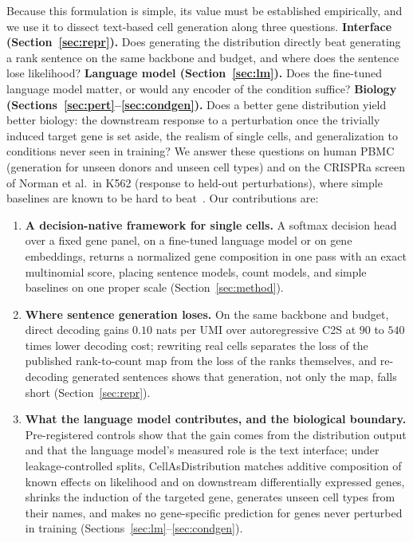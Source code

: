 \documentclass[10pt]{article}
\newcommand{\cad}{CellAsDistribution}
\begin{document}
Because this formulation is simple, its value must be established empirically, and we use it to dissect text-based cell generation along three questions.
\textbf{Interface (Section~\ref{sec:repr}).} Does generating the distribution directly beat generating a rank sentence on the same backbone and budget, and where does the sentence lose likelihood?
\textbf{Language model (Section~\ref{sec:lm}).} Does the fine-tuned language model matter, or would any encoder of the condition suffice?
\textbf{Biology (Sections~\ref{sec:pert}--\ref{sec:condgen}).} Does a better gene distribution yield better biology: the downstream response to a perturbation once the trivially induced target gene is set aside, the realism of single cells, and generalization to conditions never seen in training?
We answer these questions on human PBMC (generation for unseen donors and unseen cell types) and on the CRISPRa screen of Norman et al.\ in K562 (response to held-out perturbations), where simple baselines are known to be hard to beat~\citep{ahlmann2025deep,wei2026benchmark}.
Our contributions are:
\begin{enumerate}
\item \textbf{A decision-native framework for single cells.} A softmax decision head over a fixed gene panel, on a fine-tuned language model or on gene embeddings, returns a normalized gene composition in one pass with an exact multinomial score, placing sentence models, count models, and simple baselines on one proper scale (Section~\ref{sec:method}).
\item \textbf{Where sentence generation loses.} On the same backbone and budget, direct decoding gains $0.10$ nats per UMI over autoregressive C2S at $90$ to $540$ times lower decoding cost; rewriting real cells separates the loss of the published rank-to-count map from the loss of the ranks themselves, and re-decoding generated sentences shows that generation, not only the map, falls short (Section~\ref{sec:repr}).
\item \textbf{What the language model contributes, and the biological boundary.} Pre-registered controls show that the gain comes from the distribution output and that the language model's measured role is the text interface; under leakage-controlled splits, \cad{} matches additive composition of known effects on likelihood and on downstream differentially expressed genes, shrinks the induction of the targeted gene, generates unseen cell types from their names, and makes no gene-specific prediction for genes never perturbed in training (Sections~\ref{sec:lm}--\ref{sec:condgen}).
\end{enumerate}
\end{document}
